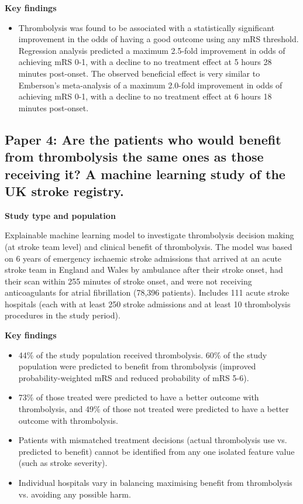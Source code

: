 \textbf{Key findings}

\begin{itemize}
    \item Thrombolysis was found to be associated with a statistically significant improvement in the odds of having a good outcome using any mRS threshold. Regression analysis predicted a maximum 2.5-fold improvement in odds of achieving mRS 0-1, with a decline to no treatment effect at 5 hours 28 minutes post-onset. The observed beneficial effect is very similar to Emberson’s meta-analysis \cite{emberson_effect_2014} of a maximum 2.0-fold improvement in odds of achieving mRS 0-1, with a decline to no treatment effect at 6 hours 18 minutes post-onset.
    
\end{itemize}

\subsection{Paper 4: Are the patients who would benefit from thrombolysis the same ones as those receiving it? A machine learning study of the UK stroke registry.\cite{pearn_are_2024}}

\textbf{Study type and population}

Explainable machine learning model to investigate thrombolysis decision making (at stroke team level) and clinical benefit of thrombolysis. The model was based on 6 years of emergency ischaemic stroke admissions that arrived at an acute stroke team in England and Wales by ambulance after their stroke onset, had their scan within 255 minutes of stroke onset, and were not receiving anticoagulants for atrial fibrillation (78,396 patients). Includes 111 acute stroke hospitals (each with at least 250 stroke admissions and at least 10 thrombolysis procedures in the study period).

\textbf{Key findings}

\begin{itemize}
    \item 44\% of the study population received thrombolysis. 60\% of the study population were predicted to benefit from thrombolysis (improved probability-weighted mRS and reduced probability of mRS 5-6).
    
    \item 73\% of those treated were predicted to have a better outcome with thrombolysis, and 49\% of those not treated were predicted to have a better outcome with thrombolysis.
    
    \item Patients with mismatched treatment decisions (actual thrombolysis use vs. predicted to benefit) cannot be identified from any one isolated feature value (such as stroke severity).
    
    \item Individual hospitals vary in balancing maximising benefit from thrombolysis vs. avoiding any possible harm.
\end{itemize}

